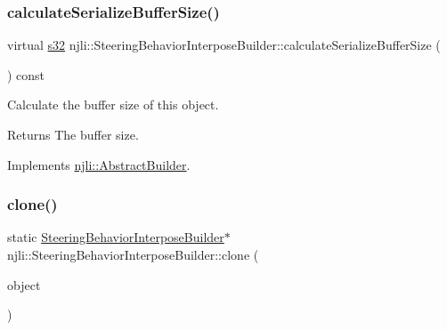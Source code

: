 \mbox{\label{classnjli_1_1_steering_behavior_interpose_builder_aa7089c006b41f518739b42c8a78a8b15}} 
\subsubsection{\texorpdfstring{calculate\+Serialize\+Buffer\+Size()}{calculateSerializeBufferSize()}}
{\footnotesize\ttfamily virtual \mbox{\hyperlink{_util_8h_aa62c75d314a0d1f37f79c4b73b2292e2}{s32}} njli\+::\+Steering\+Behavior\+Interpose\+Builder\+::calculate\+Serialize\+Buffer\+Size (\begin{DoxyParamCaption}{ }\end{DoxyParamCaption}) const\hspace{0.3cm}{\ttfamily [virtual]}}

Calculate the buffer size of this object.

\begin{DoxyReturn}{Returns}
The buffer size. 
\end{DoxyReturn}


Implements \mbox{\hyperlink{classnjli_1_1_abstract_builder_aa1d220053e182c37b31b427499c6eacf}{njli\+::\+Abstract\+Builder}}.

\mbox{\label{classnjli_1_1_steering_behavior_interpose_builder_a1358912326273917e2654b1b8a6923ad}} 
\subsubsection{\texorpdfstring{clone()}{clone()}}
{\footnotesize\ttfamily static \mbox{\hyperlink{classnjli_1_1_steering_behavior_interpose_builder}{Steering\+Behavior\+Interpose\+Builder}}$\ast$ njli\+::\+Steering\+Behavior\+Interpose\+Builder\+::clone (\begin{DoxyParamCaption}\item[{const \mbox{\hyperlink{classnjli_1_1_steering_behavior_interpose_builder}{Steering\+Behavior\+Interpose\+Builder}} \&}]{object }\end{DoxyParamCaption})\hspace{0.3cm}{\ttfamily [static]}}

